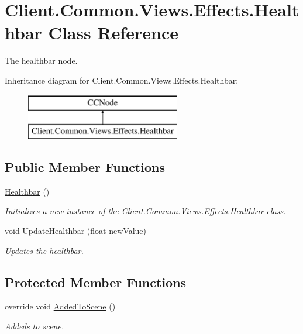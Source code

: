 \hypertarget{classClient_1_1Common_1_1Views_1_1Effects_1_1Healthbar}{}\section{Client.\+Common.\+Views.\+Effects.\+Healthbar Class Reference}
\label{classClient_1_1Common_1_1Views_1_1Effects_1_1Healthbar}


The healthbar node.  


Inheritance diagram for Client.\+Common.\+Views.\+Effects.\+Healthbar\+:\begin{figure}[H]
\begin{center}
\leavevmode
\includegraphics[height=2.000000cm]{classClient_1_1Common_1_1Views_1_1Effects_1_1Healthbar}
\end{center}
\end{figure}
\subsection*{Public Member Functions}
\begin{DoxyCompactItemize}
\item 
\hyperlink{classClient_1_1Common_1_1Views_1_1Effects_1_1Healthbar_af6428edddb0c7a12786d32e2c556b4c6}{Healthbar} ()
\begin{DoxyCompactList}\small\item\em Initializes a new instance of the \hyperlink{classClient_1_1Common_1_1Views_1_1Effects_1_1Healthbar}{Client.\+Common.\+Views.\+Effects.\+Healthbar} class. \end{DoxyCompactList}\item 
void \hyperlink{classClient_1_1Common_1_1Views_1_1Effects_1_1Healthbar_a3f937e6e88ce3e7a0873ebcdae7a821d}{Update\+Healthbar} (float new\+Value)
\begin{DoxyCompactList}\small\item\em Updates the healthbar. \end{DoxyCompactList}\end{DoxyCompactItemize}
\subsection*{Protected Member Functions}
\begin{DoxyCompactItemize}
\item 
override void \hyperlink{classClient_1_1Common_1_1Views_1_1Effects_1_1Healthbar_a6771124dadaa9b88d0fab1884a91af7f}{Added\+To\+Scene} ()
\begin{DoxyCompactList}\small\item\em Addeds to scene. \end{DoxyCompactList}\end{DoxyCompactItemize}


